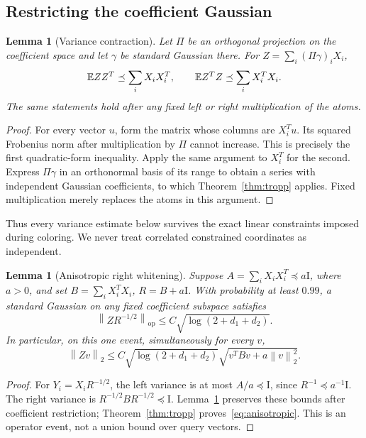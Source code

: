 \documentclass[11pt]{article}
\newtheorem{lemma}[theorem]{Lemma}
\theoremstyle{remark}\newtheorem{remark}[theorem]{Remark}
\newcommand{\op}{\mathrm{op}}\newcommand{\Frob}{\mathrm F}
\newcommand{\norm}[1]{\left\lVert#1\right\rVert}\newcommand{\abs}[1]{\left|#1\right|}
\newcommand{\Id}{\mathrm I}\newcommand{\dbar}{\bar d}
\numberwithin{equation}{section}
\begin{document}
\subsection{Restricting the coefficient Gaussian}
\begin{lemma}[Variance contraction]\label{lem:projection}
Let $\Pi$ be an orthogonal projection on the coefficient space and let $\gamma$ be standard Gaussian there. For $Z=\sum_i(\Pi\gamma)_iX_i$,
\[
 \mathbb E ZZ^T\preceq\sum_iX_iX_i^T,\qquad
 \mathbb E Z^TZ\preceq\sum_iX_i^TX_i.
\]
The same statements hold after any fixed left or right multiplication of the atoms.
\end{lemma}
\begin{proof}
For every vector $u$, form the matrix whose columns are $X_i^Tu$. Its squared Frobenius norm after multiplication by $\Pi$ cannot increase. This is precisely the first quadratic-form inequality. Apply the same argument to $X_i^T$ for the second. Express $\Pi\gamma$ in an orthonormal basis of its range to obtain a series with independent Gaussian coefficients, to which Theorem~\ref{thm:tropp} applies. Fixed multiplication merely replaces the atoms in this argument.
\end{proof}
Thus every variance estimate below survives the exact linear constraints imposed during coloring. We never treat correlated constrained coordinates as independent.

\begin{lemma}[Anisotropic right whitening]\label{lem:anisotropic}
Suppose $A=\sum_iX_iX_i^T\preceq a\Id$, where $a>0$, and set
$B=\sum_iX_i^TX_i$, $R=B+a\Id$. With probability at least $0.99$, a standard Gaussian on any fixed coefficient subspace satisfies
\begin{equation}\label{eq:anisotropic}
 \norm{Z R^{-1/2}}_\op\le C\sqrt{\log(2+d_1+d_2)}.
\end{equation}
In particular, on this one event, simultaneously for every $v$,
\[
 \norm{Zv}_2\le C\sqrt{\log(2+d_1+d_2)}\sqrt{v^TBv+a\norm v_2^2}.
\]
\end{lemma}
\begin{proof}
For $Y_i=X_iR^{-1/2}$, the left variance is at most $A/a\preceq\Id$, since $R^{-1}\preceq a^{-1}\Id$. The right variance is $R^{-1/2}BR^{-1/2}\preceq\Id$. Lemma~\ref{lem:projection} preserves these bounds after coefficient restriction; Theorem~\ref{thm:tropp} proves~\eqref{eq:anisotropic}. This is an operator event, not a union bound over query vectors.
\end{proof}
\end{document}
